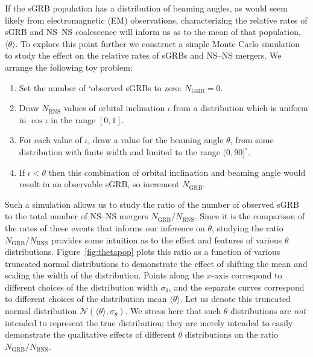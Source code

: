 \documentclass[twocolumn,nofootinbib]{revtex4-1}
\newcommand{\BNS}{\ac{NS}--\ac{NS}\xspace}
\def\electro#1{electromagnetic#1 (EM#1)\gdef\electro{EM}}
\begin{document}
If the \ac{sGRB} population has a distribution of beaming angles, as would seem likely from \electro{} observations, characterizing the relative rates of \ac{sGRB} and \BNS coalescence will inform us as to the mean of that population, $\langle \theta \rangle$.
To explore this point further we construct a simple Monte Carlo simulation to study the effect on the relative rates of \acp{sGRB} and \BNS mergers.
We arrange the following toy problem:
%
\begin{enumerate}
    \item Set the number of `observed \acp{sGRB} to zero: $N_{\mathrm{GRB}}=0$.
    \item Draw $N_{\mathrm{BNS}}$ values of orbital inclination $\iota$ from a distribution which is uniform in $\cos \iota$ in the range $[0,1]$.
    \item For each value of $\iota$, draw a value for the beaming angle $\theta$, from some distribution with finite width and limited to the range $(0,90]^{\circ}$.
    \item If $\iota<\theta$ then this combination of orbital inclination and beaming angle would result in an observable \ac{sGRB}, so increment $N_{\mathrm{GRB}}$.
\end{enumerate}
%
Such a simulation allows us to study the ratio of the number of observed \ac{sGRB} to the total number of \BNS mergers $N_{\mathrm{GRB}}/N_{\mathrm{BNS}}$.
Since it is the comparison of the rates of these events that informs our inference on $\theta$,  studying the ratio $N_{\mathrm{GRB}}/N_{\mathrm{BNS}}$ provides some intuition as to the effect and features of various $\theta$ distributions.
Figure~\ref{fig:thetapop} plots this ratio as a function of various truncated normal distributions to demonstrate the effect of shifting the mean and scaling the width of the distribution.
Points along the $x$-axis correspond to different choices of the distribution width $\sigma_{\theta}$, and the separate curves correspond to different choices of the distribution mean $\langle \theta \rangle$.
Let us denote this truncated normal distribution ${\mathcal N}(\langle \theta \rangle, \sigma_{\theta})$.
We stress here that such $\theta$ distributions are \emph{not} intended to represent the true distribution; they are merely intended to easily demonstrate the qualitative effects of different $\theta$ distributions on the ratio $N_{\mathrm{GRB}}/N_{\mathrm{BNS}}$.
\end{document}
